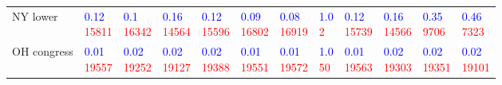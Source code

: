 \begin{tabular}{llllllllllll}
NY lower    &  \makecell{\textcolor{blue}{0.12} \\ \textcolor{red}{15811}} &   \makecell{\textcolor{blue}{0.1} \\ \textcolor{red}{16342}} &  \makecell{\textcolor{blue}{0.16} \\ \textcolor{red}{14564}} &  \makecell{\textcolor{blue}{0.12} \\ \textcolor{red}{15596}} &  \makecell{\textcolor{blue}{0.09} \\ \textcolor{red}{16802}} &  \makecell{\textcolor{blue}{0.08} \\ \textcolor{red}{16919}} &     \makecell{\textcolor{blue}{1.0} \\ \textcolor{red}{2}} &  \makecell{\textcolor{blue}{0.12} \\ \textcolor{red}{15739}} &  \makecell{\textcolor{blue}{0.16} \\ \textcolor{red}{14566}} &   \makecell{\textcolor{blue}{0.35} \\ \textcolor{red}{9706}} &   \makecell{\textcolor{blue}{0.46} \\ \textcolor{red}{7323}} \\
OH congress &  \makecell{\textcolor{blue}{0.01} \\ \textcolor{red}{19557}} &  \makecell{\textcolor{blue}{0.02} \\ \textcolor{red}{19252}} &  \makecell{\textcolor{blue}{0.02} \\ \textcolor{red}{19127}} &  \makecell{\textcolor{blue}{0.02} \\ \textcolor{red}{19388}} &  \makecell{\textcolor{blue}{0.01} \\ \textcolor{red}{19551}} &  \makecell{\textcolor{blue}{0.01} \\ \textcolor{red}{19572}} &    \makecell{\textcolor{blue}{1.0} \\ \textcolor{red}{50}} &  \makecell{\textcolor{blue}{0.01} \\ \textcolor{red}{19563}} &  \makecell{\textcolor{blue}{0.02} \\ \textcolor{red}{19303}} &  \makecell{\textcolor{blue}{0.02} \\ \textcolor{red}{19351}} &  \makecell{\textcolor{blue}{0.02} \\ \textcolor{red}{19101}} \\

\end{tabular}
